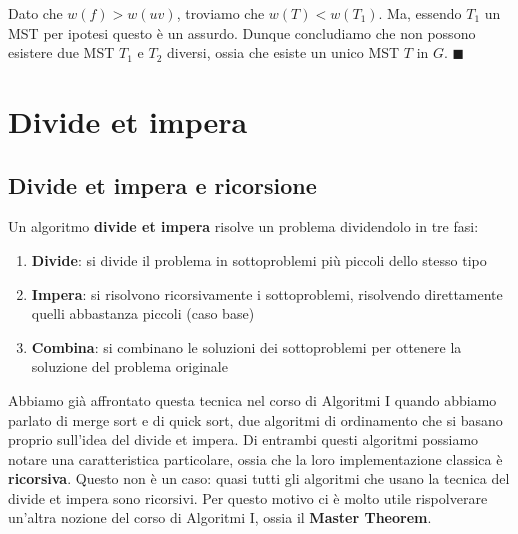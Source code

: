 \documentclass[11pt, a4paper, titlepage, oneside]{scrbook}
\begin{document}
Dato che $w(f) > w(uv)$, troviamo che $w(T) < w(T_1)$. Ma, essendo $T_1$ un MST per ipotesi questo è un assurdo. Dunque concludiamo che non possono esistere due MST $T_1$ e $T_2$ diversi, ossia che esiste un unico MST $T$ in $G$. $\blacksquare$


\chapter{Divide et impera}

\section{Divide et impera e ricorsione}

\begin{Definizione}
\label{def-divide-et-impera}
Un algoritmo \textbf{divide et impera} risolve un problema dividendolo in tre fasi:
\begin{enumerate}[label=\arabic*°]
    \item \textbf{Divide}: si divide il problema in sottoproblemi più piccoli dello stesso tipo
    \item \textbf{Impera}: si risolvono ricorsivamente i sottoproblemi, risolvendo direttamente quelli abbastanza piccoli (caso base)
    \item \textbf{Combina}: si combinano le soluzioni dei sottoproblemi per ottenere la soluzione del problema originale
\end{enumerate}
\end{Definizione}

Abbiamo già affrontato questa tecnica nel corso di Algoritmi I quando abbiamo parlato di merge sort e di quick sort, due algoritmi di ordinamento che si basano proprio sull'idea del divide et impera. Di entrambi questi algoritmi possiamo notare una caratteristica particolare, ossia che la loro implementazione classica è \textbf{ricorsiva}. Questo non è un caso: quasi tutti gli algoritmi che usano la tecnica del divide et impera sono ricorsivi. Per questo motivo ci è molto utile rispolverare un'altra nozione del corso di Algoritmi I, ossia il \textbf{Master Theorem}.
\end{document}
